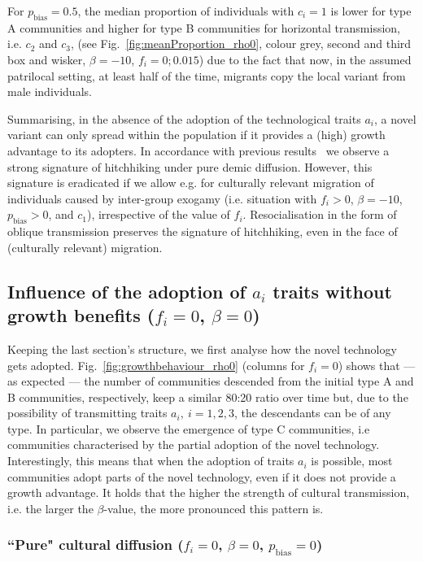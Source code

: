 \documentclass[9pt,twocolumn,twoside,lineno]{pnas-new}
\begin{document}
For $p_\text{bias} = 0.5$, the median proportion of individuals with $c_i=1$ is lower for type A communities and higher for type B communities for horizontal transmission, i.e. $c_2$ and $c_3$, (see Fig.~\ref{fig:meanProportion_rho0}, colour grey, second and third box and wisker, $\beta=-10$, $f_i=0;0.015$) due to the fact that now, in the assumed patrilocal setting, at least half of the time, migrants copy the local variant from male individuals.

Summarising, in the absence of the adoption of the technological traits $a_i$, a novel variant can only spread within the population if it provides a (high) growth advantage to its adopters. 
In accordance with previous results~\citep[cf.][]{ackland_cultural_2007} we observe a strong signature of hitchhiking under pure demic diffusion. However, this signature is eradicated if we allow e.g. for culturally relevant migration of individuals caused by inter-group exogamy (i.e. situation with $f_i>0$, $\beta=-10$, $p_\text{bias}>0$, and  $c_1$), irrespective of the value of $f_i$. Resocialisation in the form of oblique transmission preserves the signature of hitchhiking, even in the face of (culturally relevant) migration. 

\subsection*{Influence of the adoption of $a_i$ traits without growth benefits ($f_i=0$, $\beta=0$)}

Keeping the last section's structure, we first analyse how the novel technology gets adopted.
Fig.~\ref{fig:growthbehaviour_rho0} (columns for $f_i=0$) shows that --- as expected --- the number of communities descended from the initial type A and B communities, respectively, keep a similar 80:20 ratio over time but, due to the possibility of transmitting traits $a_i,\ i=1,2,3$, the descendants can be of any type. In particular, we observe the emergence of type C communities, i.e communities characterised by the partial adoption of the novel technology. Interestingly, this means that when the adoption of traits $a_i$ is possible, most communities adopt parts of the novel technology, even if it does not provide a growth advantage. It holds that the higher the strength of cultural transmission, i.e. the larger the $\beta$-value, the more pronounced this pattern is. 

\subsubsection*{``Pure" cultural diffusion ($f_i=0$, $\beta=0$, $p_\text{bias}=0$)}
\end{document}
